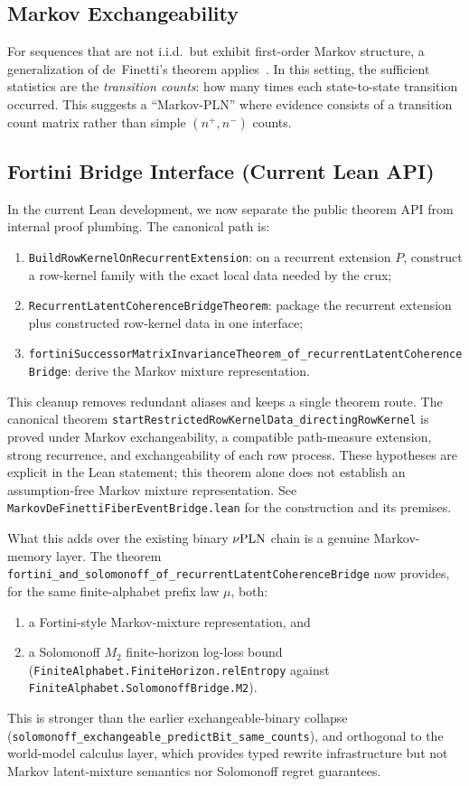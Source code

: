 \documentclass[]{article}
\begin{document}
\subsection{Markov Exchangeability}
For sequences that are not i.i.d.\ but exhibit first-order Markov
structure, a generalization of de~Finetti's theorem
applies~\cite{diaconisfreedman}.  In this setting, the sufficient
statistics are the \emph{transition counts}: how many times each
state-to-state transition occurred.  This suggests a ``Markov-PLN''
where evidence consists of a transition count matrix rather than
simple $(n^+, n^-)$ counts.

\subsection{Fortini Bridge Interface (Current Lean API)}
In the current Lean development, we now separate the public theorem
API from internal proof plumbing.  The canonical path is:
\begin{enumerate}
\item \texttt{BuildRowKernelOnRecurrentExtension}: on a recurrent extension
$P$, construct a row-kernel family with the exact local data needed by
the crux;
\item \texttt{RecurrentLatentCoherenceBridgeTheorem}: package the
recurrent extension plus constructed row-kernel data in one interface;
\item \texttt{fortiniSuccessorMatrixInvarianceTheorem\_of\_recurrentLatentCoherenceBridge}:
derive the Markov mixture representation.
\end{enumerate}

This cleanup removes redundant aliases and keeps a single theorem route.
The canonical theorem \texttt{startRestrictedRowKernelData\_directingRowKernel}
is proved under Markov exchangeability, a compatible path-measure extension,
strong recurrence, and exchangeability of each row process. These hypotheses
are explicit in the Lean statement; this theorem alone does not establish
an assumption-free Markov mixture representation. See
\texttt{MarkovDeFinettiFiberEventBridge.lean} for the construction and its premises.

What this adds over the existing binary $\nu\textup{PLN}$ chain is a genuine
Markov-memory layer.  The theorem
\texttt{fortini\_and\_solomonoff\_of\_recurrentLatentCoherenceBridge}
now provides, for the same finite-alphabet prefix law $\mu$, both:
\begin{enumerate}
\item a Fortini-style Markov-mixture representation, and
\item a Solomonoff $M_2$ finite-horizon log-loss bound
(\texttt{FiniteAlphabet.FiniteHorizon.relEntropy} against
\texttt{FiniteAlphabet.SolomonoffBridge.M2}).
\end{enumerate}
This is stronger than the earlier exchangeable-binary collapse
(\texttt{solomonoff\_exchangeable\_predictBit\_same\_counts}), and
orthogonal to the world-model calculus layer, which provides typed
rewrite infrastructure but not Markov latent-mixture semantics nor
Solomonoff regret guarantees.
\end{document}

